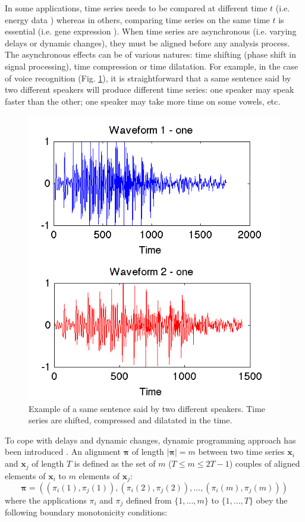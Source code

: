 In some applications, time series needs to be compared at different time $t$ (i.e. energy data \cite{Najmeddine2012}) whereas in others, comparing time series on the same time $t$ is essential (i.e. gene expression \cite{Chouakria2007}). When time series are asynchronous (i.e. varying delays or dynamic changes), they must be aligned before any analysis process. The asynchronous effects can be of various natures: time shifting (phase shift in signal processing), time compression or time dilatation. For example, in the case of voice recognition (Fig. \ref{fig:Voice_Example}), it is straightforward that a same sentence said by two different speakers will produce different time series: one speaker may speak faster than the other; one speaker may take more time on some vowels, etc.

\begin{figure}[h!]
\centering
\includegraphics[width=0.5\linewidth]{images/Voice_Example}
\caption{Example of a same sentence said by two different speakers. Time series are shifted, compressed and dilatated in the time.}
\label{fig:Voice_Example}
\end{figure}
To cope with delays and dynamic changes, dynamic programming approach has been introduced \cite{Berndt1994a}. An alignment $\boldsymbol{\pi}$ of length $|\boldsymbol{\pi}|=m$ between two time series $\textbf{x}_i$ and $\textbf{x}_j$ of length $T$ is defined as the set of $m$ ($T \leq m \leq 2T-1$) couples of aligned elements of $\textbf{x}_i$ to $m$ elements of $\textbf{x}_j$:
\begin{equation}
\boldsymbol{\pi} = 
\left(  
(\pi_i(1),\pi_j(1)), 
(\pi_i(2),\pi_j(2)), 
\ldots,
(\pi_i(m),\pi_j(m))
\right) 
\end{equation}
\noindent where the applications $\pi_i$ and $\pi_j$ defined from $\{1, ..., m\}$ to $\{1, ..., T\}$ obey the following boundary monotonicity conditions: 
